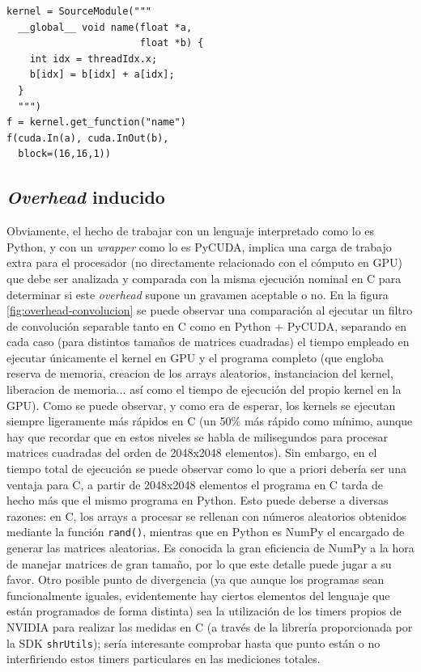 \documentclass[twocolumn,twoside]{Jornadas}
\begin{document}
\begin{lstlisting}
kernel = SourceModule("""
  __global__ void name(float *a, 
                       float *b) {
    int idx = threadIdx.x;
    b[idx] = b[idx] + a[idx];
  }
  """)
f = kernel.get_function("name")
f(cuda.In(a), cuda.InOut(b), 
  block=(16,16,1))
\end{lstlisting}

\subsection{\emph{Overhead} inducido}

Obviamente, el hecho de trabajar con un lenguaje interpretado como lo es Python, y con un \emph{wrapper} como lo es PyCUDA, implica una carga de trabajo extra para el procesador (no directamente relacionado con el cómputo en GPU) que debe ser analizada y comparada con la misma ejecución nominal en C para determinar si este \emph{overhead} supone un gravamen aceptable o no. En la figura \ref{fig:overhead-convolucion} se puede observar una comparación al ejecutar un filtro de convolución separable \cite{imagecuda} tanto en C como en Python + PyCUDA, separando en cada caso (para distintos tamaños de matrices cuadradas) el tiempo empleado en ejecutar únicamente el kernel en GPU y el programa completo (que engloba reserva de memoria, creacion de los arrays aleatorios, instanciacion del kernel, liberacion de memoria... así como el tiempo de ejecución del propio kernel en la GPU). Como se puede observar, y como era de esperar, los kernels se ejecutan siempre ligeramente más rápidos en C (un 50\% más rápido como mínimo, aunque hay que recordar que en estos niveles se habla de milisegundos para procesar matrices cuadradas del orden de 2048x2048 elementos). Sin embargo, en el tiempo total de ejecución se puede observar como lo que a priori debería ser una ventaja para C, a partir de 2048x2048 elementos el programa en C tarda de hecho más que el mismo programa en Python. Esto puede deberse a diversas razones: en C, los arrays a procesar se rellenan con números aleatorios obtenidos mediante la función {\tt rand()}, mientras que en Python es NumPy el encargado de generar las matrices aleatorias. Es conocida la gran eficiencia de NumPy a la hora de manejar matrices de gran tamaño, por lo que este detalle puede jugar a su favor. Otro posible punto de divergencia (ya que aunque los programas sean funcionalmente iguales, evidentemente hay ciertos elementos del lenguaje que están programados de forma distinta) sea la utilización de los timers propios de NVIDIA para realizar las medidas en C (a través de la librería proporcionada por la SDK {\tt shrUtils}); sería interesante comprobar hasta que punto están o no interfiriendo estos timers particulares en las mediciones totales.
\end{document}
